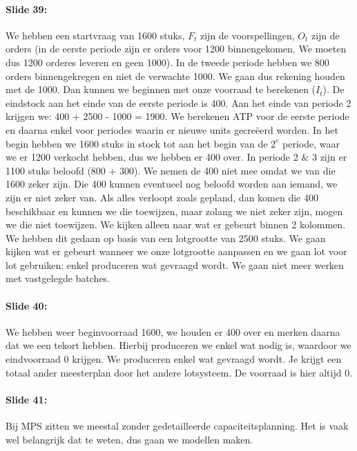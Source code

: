 \documentclass[10pt,a4paper]{report}
\begin{document}
\paragraph{Slide 39:} We hebben een startvraag van 1600 stuks, $F_{t}$ zijn de voorspellingen, $O_{t}$ zijn de orders (in de eerste periode zijn er orders voor 1200 binnengekomen. We moeten dus 1200 orderes leveren en geen 1000). In de tweede periode hebben we 800 orders binnengekregen en niet de verwachte 1000. We gaan dus rekening houden met de 1000. Dan kunnen we beginnen met onze voorraad te berekenen ($I_{t}$). De eindstock aan het einde van de eerste periode is 400. Aan het einde van periode 2 krijgen we: 400 + 2500 - 1000 = 1900. We berekenen ATP voor de eerste periode en daarna enkel voor periodes waarin er nieuwe units gecre\"eerd worden. In het begin hebben we 1600 stuks in stock tot aan het begin van de $2^{e}$ periode, waar we er 1200 verkocht hebben, dus we hebben er 400 over. In periode 2 $\&$ 3 zijn er 1100 stuks beloofd (800 + 300). We nemen de 400 niet mee omdat we van die 1600 zeker zijn. Die 400 kunnen eventueel nog beloofd worden aan iemand, we zijn er niet zeker van. Als alles verloopt zoals gepland, dan komen die 400 beschikbaar en kunnen we die toewijzen, maar zolang we niet zeker zijn, mogen we die niet toewijzen. We kijken alleen naar wat er gebeurt binnen 2 kolommen.\\
We hebben dit gedaan op basis van een lotgrootte van 2500 stuks. We gaan kijken wat er gebeurt wanneer we onze lotgrootte aanpassen en we gaan lot voor lot gebruiken: enkel produceren wat gevraagd wordt. We gaan niet meer werken met vastgelegde batches.

\paragraph{Slide 40:} We hebben weer beginvoorraad 1600, we houden er 400 over en merken daarna dat we een tekort hebben. Hierbij produceren we enkel wat nodig is, waardoor we eindvoorraad 0 krijgen. We produceren enkel wat gevraagd wordt. Je krijgt een totaal ander meesterplan door het andere lotsysteem. De voorraad is hier altijd 0.

\paragraph{Slide 41:} Bij MPS zitten we meestal zonder gedetailleerde capaciteitsplanning. Het is vaak wel belangrijk dat te weten, dus gaan we modellen maken.
\end{document}
